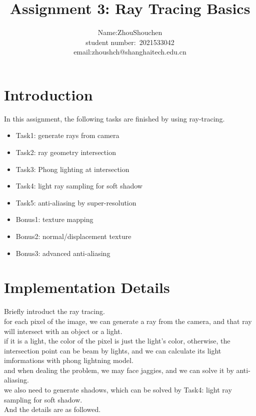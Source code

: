 \documentclass[acmtog]{acmart}
\title{Assignment 3: {Ray Tracing Basics}}
\author{Name:\quad ZhouShouchen  \\ student number:\ 2021533042
\\email:\quad zhoushch@shanghaitech.edu.cn}
\begin{document}
\maketitle

\vspace*{2 ex}

\section{Introduction}
In this assignment, the following tasks are finished by using ray-tracing.
\begin{itemize}
\item Task1: generate rays from camera
\item Task2: ray geometry intersection
\item Task3: Phong lighting at intersection
\item Task4: light ray sampling for soft shadow
\item Task5: anti-aliasing by super-resolution
\item Bonus1: texture mapping
\item Bonus2: normal/displacement texture
\item Bonus3: advanced anti-aliasing
\end{itemize}

\section{Implementation Details}
Briefly introduct the ray tracing.\\
for each pixel of the image, we can generate a ray from the camera, and that ray will intersect with an object or a light.\\
if it is a light, the color of the pixel is just the light's color,
otherwise, the intersection point can be beam by lights, and we can calculate its light imformations with phong lightning model.\\
and when dealing the problem, we may face jaggies, and we can solve it by anti-aliasing.\\
we also need to generate shadows, which can be solved by Task4: light ray sampling for soft shadow.\\
And the details are as followed.
\end{document}
